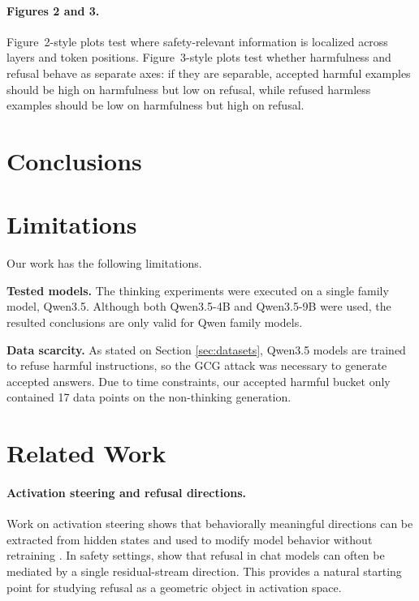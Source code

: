 \documentclass[nohyperref]{article}
\theoremstyle{plain}
\theoremstyle{definition}
\theoremstyle{remark}
\begin{document}
\paragraph{Figures 2 and 3.} Figure~2-style plots test where safety-relevant information is localized across layers and token positions. Figure~3-style plots test whether harmfulness and refusal behave as separate axes: if they are separable, accepted harmful examples should be high on harmfulness but low on refusal, while refused harmless examples should be low on harmfulness but high on refusal.


\section{Conclusions}
\section{Limitations}
Our work has the following limitations. 

\textbf{Tested models.} The thinking experiments were executed on a single family model, Qwen3.5. Although both Qwen3.5-4B and Qwen3.5-9B were used, the resulted conclusions are only valid for Qwen family models. 

\textbf{Data scarcity.} As stated on Section \ref{sec:datasets}, Qwen3.5 models are trained to refuse harmful instructions, so the GCG attack was necessary to generate accepted answers. Due to time constraints, our accepted harmful bucket only contained 17 data points on the non-thinking generation. 



\section{Related Work}

\paragraph{Activation steering and refusal directions.} Work on activation steering shows that behaviorally meaningful directions can be extracted from hidden states and used to modify model behavior without retraining \citep{turner2023activation, rimsky2024steering}. In safety settings, \citet{arditi2024refusal} show that refusal in chat models can often be mediated by a single residual-stream direction. This provides a natural starting point for studying refusal as a geometric object in activation space.
\end{document}
